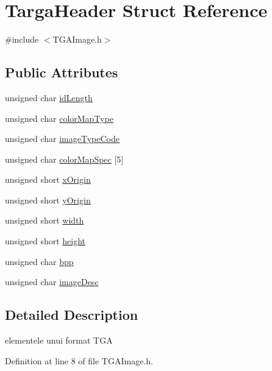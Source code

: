 \hypertarget{struct_targa_header}{\section{Targa\-Header Struct Reference}
\label{struct_targa_header}
}


{\ttfamily \#include $<$T\-G\-A\-Image.\-h$>$}

\subsection*{Public Attributes}
\begin{DoxyCompactItemize}
\item 
unsigned char \hyperlink{struct_targa_header_a524d6939e514516a0ebd484f6aa6e19b}{id\-Length}
\item 
unsigned char \hyperlink{struct_targa_header_af972cd75dd815e9ca7d1b30d5ded3880}{color\-Map\-Type}
\item 
unsigned char \hyperlink{struct_targa_header_af1dbc0ea2e05d42678ff51c6cc43b630}{image\-Type\-Code}
\item 
unsigned char \hyperlink{struct_targa_header_a486c82f94722d32eb0c4c2c8344d9714}{color\-Map\-Spec} \mbox{[}5\mbox{]}
\item 
unsigned short \hyperlink{struct_targa_header_af1e612255d864f0c4c7f0689313b1408}{x\-Origin}
\item 
unsigned short \hyperlink{struct_targa_header_aaf344ab9c2e3d4c2146d478274f84724}{y\-Origin}
\item 
unsigned short \hyperlink{struct_targa_header_a3725c3553a93e16ba987c2b71e3c2b8b}{width}
\item 
unsigned short \hyperlink{struct_targa_header_a480252aac98d30159e726798679c9ee6}{height}
\item 
unsigned char \hyperlink{struct_targa_header_a808bc7fd8269ba401a755f54d973e803}{bpp}
\item 
unsigned char \hyperlink{struct_targa_header_ae575637b398fc5dab73ebe83bd28a217}{image\-Desc}
\end{DoxyCompactItemize}


\subsection{Detailed Description}
elementele unui format T\-G\-A 

Definition at line 8 of file T\-G\-A\-Image.\-h.



